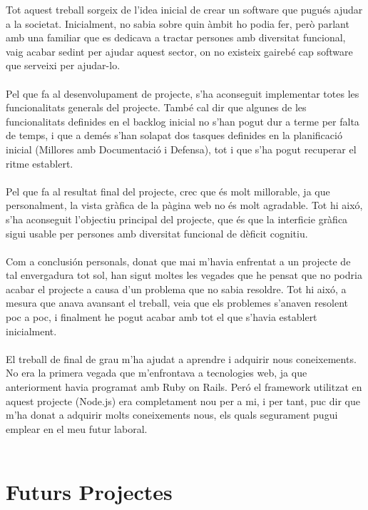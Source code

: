 \documentclass[11pt,catalan,listoffigures,listoftables]{tfgetsinf}
\begin{document}
Tot aquest treball sorgeix de l'idea inicial de crear un software que pugués ajudar a la societat. Inicialment, no sabia sobre quin àmbit ho podia fer, però parlant amb una familiar que es dedicava a tractar persones amb diversitat funcional, vaig acabar sedint per ajudar aquest sector, on no existeix gairebé cap software que serveixi per ajudar-lo.\\ \\
Pel que fa al desenvolupament de projecte, s'ha aconseguit implementar totes les funcionalitats generals del projecte. També cal dir que algunes de les funcionalitats definides en el backlog inicial no s'han pogut dur a terme per falta de temps, i que a demés s'han solapat dos tasques definides en la planificació inicial (Millores amb Documentació i Defensa), tot i que s'ha pogut recuperar el ritme establert.\\ \\
Pel que fa al resultat final del projecte, crec que és molt millorable, ja que personalment, la vista gràfica de la pàgina web no és molt agradable. Tot hi aixó, s'ha aconseguit l'objectiu principal del projecte, que és que la interficie gràfica sigui usable per persones amb diversitat funcional de dèficit cognitiu.\\ \\
Com a conclusión personals, donat que mai m'havia enfrentat a un projecte de tal envergadura tot sol, han sigut moltes les vegades que he pensat que no podria acabar el projecte a causa d'un problema que no sabia resoldre. Tot hi aixó, a mesura que anava avansant el treball, veia que els problemes s'anaven resolent poc a poc, i finalment he pogut acabar amb tot el que s'havia establert inicialment.\\ \\
El treball de final de grau m'ha ajudat a aprendre i adquirir nous coneixements. No era la primera vegada que m'enfrontava a tecnologies web, ja que anteriorment havia programat amb Ruby on Rails. Peró el framework utilitzat en aquest projecte (Node.js) era completament nou per a mi, i per tant, puc dir que m'ha donat a adquirir molts coneixements nous, els quals segurament pugui emplear en el meu futur laboral.\\ \\
\newpage
\section{Futurs Projectes}
\end{document}
